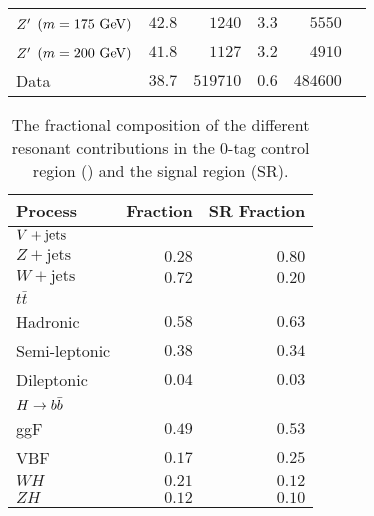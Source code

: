 \begin{table}[htpb]
\begin{tabular}{@{}lrrrrr@{}}
  $Z'$ $\left(m=175~\mathrm{GeV}\right)$ & $42.8$               & $1240$                       & $3.3$          & $5550$                  \\
  $Z'$ $\left(m=200~\mathrm{GeV}\right)$ & $41.8$               & $1127$                       & $3.2$          & $4910$                  \\
  Data                                & $38.7$               & $519710$                     & $0.6$          & $484600$                \\
  \bottomrule
 \end{tabular}
 \label{table:efficiencies_and_yields}
\end{table}

\begin{table}[htpb]
 \centering
 \caption[The fractional composition of the different resonant contributions in the $0$-tag control region and signal region.]{%
  The fractional composition of the different resonant contributions in the $0$-tag control region (\CRQCD{}) and the signal region (SR).}
 \begin{tabular}{@{}lrr@{}}
  \toprule
  Process                                   & \CRQCD{} Fraction & SR Fraction \\ \midrule
  $\Vjets$                                  &                   &             \\
  \phantom{$\Vjets$\quad} $Z+\mathrm{jets}$ & $0.28$            & $0.80$      \\
  \phantom{$\Vjets$\quad} $W+\mathrm{jets}$ & $0.72$            & $0.20$      \\
  $t\bar{t}$                                &                   &             \\
  \phantom{$t\bar{t}$\quad} Hadronic        & $0.58$            & $0.63$      \\
  \phantom{$t\bar{t}$\quad} Semi-leptonic   & $0.38$            & $0.34$      \\
  \phantom{$t\bar{t}$\quad} Dileptonic      & $0.04$            & $0.03$      \\
  $\Hbb$                                    &                   &             \\
  \phantom{$\Hbb$\quad} ggF                 & $0.49$            & $0.53$      \\
  \phantom{$\Hbb$\quad} VBF                 & $0.17$            & $0.25$      \\
  \phantom{$\Hbb$\quad} $WH$                & $0.21$            & $0.12$      \\
  \phantom{$\Hbb$\quad} $ZH$                & $0.12$            & $0.10$      \\
  \bottomrule
 \end{tabular}
 \label{table:fractional_composition}
\end{table}

